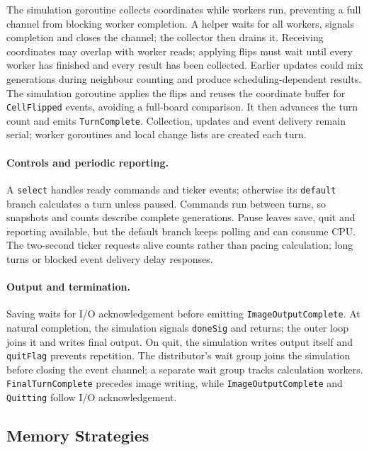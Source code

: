 \documentclass[10pt,a4paper,twocolumn]{article}
\begin{document}
The simulation goroutine collects coordinates while workers run, preventing
a full channel from blocking worker completion. A helper waits for all workers,
signals completion and closes the channel; the collector then drains it.
Receiving coordinates may overlap with worker reads; applying flips
must wait until every worker has finished and every result has been collected.
Earlier updates could mix generations during neighbour counting and produce
scheduling-dependent results. The simulation goroutine applies the flips and
reuses the coordinate buffer for \texttt{CellFlipped} events, avoiding a full-board
comparison. It then advances the turn count and emits \texttt{TurnComplete}.
Collection, updates and event delivery remain serial; worker goroutines and
local change lists are created each turn.

\paragraph{Controls and periodic reporting.}
A \texttt{select} handles ready commands and ticker events; otherwise its
\texttt{default} branch calculates a turn unless paused. Commands run between
turns, so snapshots and counts describe complete generations. Pause leaves
save, quit and reporting available, but the default branch keeps polling and
can consume CPU. The two-second ticker requests alive counts rather than
pacing calculation; long turns or blocked event delivery delay responses.

\paragraph{Output and termination.}
Saving waits for I/O acknowledgement before emitting
\texttt{ImageOutputComplete}. At natural completion, the simulation signals
\texttt{doneSig} and returns; the outer loop joins it and writes final output.
On quit, the simulation writes output itself and \texttt{quitFlag} prevents
repetition. The distributor's wait group joins the simulation before closing
the event channel; a separate wait group tracks calculation workers.
\texttt{FinalTurnComplete} precedes image writing, while
\texttt{ImageOutputComplete} and \texttt{Quitting} follow I/O acknowledgement.


\subsection{Memory Strategies}
\end{document}
